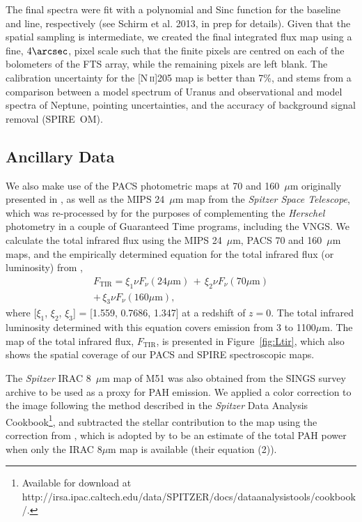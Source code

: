 \documentclass[preprint2]{aastex}
\begin{document}
The final spectra were fit with a polynomial and Sinc function for the baseline and line, respectively (see Schirm et al. 2013, in prep for details). Given that the spatial sampling is intermediate, we created the final integrated flux map using a fine, $4\arcsec$, pixel scale such that the finite pixels are centred on each of the bolometers of the FTS array, while the remaining pixels are left blank.  The calibration uncertainty for the [N\,\textsc{ii}]205 map is better than 7\%, and stems from a comparison between a model spectrum of Uranus and observational and model spectra of Neptune, pointing uncertainties, and the accuracy of background signal removal (SPIRE~OM).

\subsection{Ancillary Data}\label{ancillary}
We also make use of the PACS photometric maps at 70 and 160~$\mu$m originally presented in \citet{2012ApJ...755..165M}, as well as the MIPS 24~$\mu$m map from the \emph{Spitzer Space Telescope}, which was re-processed by \citet{2012MNRAS.423..197B} for the purposes of complementing the \emph{Herschel} photometry in a couple of Guaranteed Time programs, including the VNGS.  We calculate the total infrared flux using the MIPS 24~$\mu$m, PACS 70 and 160~$\mu$m maps, and the empirically determined equation for the total infrared flux (or luminosity) from \citet{2002ApJ...576..159D},
\begin{eqnarray}\label{eqn:Ftir}
F_{\mathrm{TIR}} = \xi_{1}\nu F_{\nu}(24 \mu\mathrm{m}) \, + \, \xi_{2}\nu F_{\nu}(70 \mu\mathrm{m})
	\nonumber \\
	+ \, \xi_{3}\nu F_{\nu}(160 \mu\mathrm{m}),
\end{eqnarray}
where [$\xi_{1}$, $\xi_{2}$, $\xi_{3}$] = [1.559, 0.7686, 1.347] at a redshift of $z=0$.  The total infrared luminosity determined with this equation covers emission from 3 to 1100$\mu$m.  The map of the total infrared flux, $F_{\mathrm{TIR}}$, is presented in Figure~\ref{fig:Ltir}, which also shows the spatial coverage of our PACS and SPIRE spectroscopic maps.

The \emph{Spitzer} IRAC 8~$\mu$m map of M51 was also obtained from the SINGS survey \citep{2003PASP..115..928K} archive to be used as a proxy for PAH emission.  We applied a color correction to the image following the method described in the \emph{Spitzer} Data Analysis Cookbook\footnote{Available for download at http://irsa.ipac.caltech.edu/data/SPITZER/docs/dataanalysistools/cookbook/.}, and subtracted the stellar contribution to the map using the correction from \citet{2010ApJ...715..506M}, which is adopted by \citet{2012ApJ...747...81C} to be an estimate of the total PAH power when only the IRAC 8$\mu$m map is available (their equation (2)).
\end{document}
